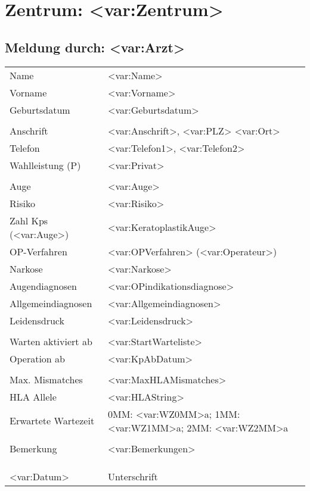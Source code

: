 \documentclass[a4,10pt]{scrreprt}
\begin{document}
\begin{table}
\setcounter{secnumdepth}{0}
\section{Zentrum: <var:Zentrum>}
\subsection{Meldung durch: <var:Arzt>}
\begin{tabular}{lp{12cm}} \hline
Name & <var:Name> \\
Vorname & <var:Vorname> \\
Geburtsdatum & <var:Geburtsdatum> \\ \hline
\\ \hline
Anschrift & <var:Anschrift>,  <var:PLZ> <var:Ort>\\
Telefon & <var:Telefon1>, <var:Telefon2>\\
Wahlleistung (P) & <var:Privat>\\ \hline
\\ \hline
Auge & <var:Auge>\\
Risiko & <var:Risiko>\\
Zahl Kps (<var:Auge>) & <var:KeratoplastikAuge>\\
OP-Verfahren & <var:OPVerfahren> (<var:Operateur>)\\ 
Narkose & <var:Narkose>\\ 
Augendiagnosen & <var:OPindikationsdiagnose>\\
Allgemeindiagnosen & <var:Allgemeindiagnosen>\\ \hline
Leidensdruck & <var:Leidensdruck>\\ \hline
\\ \hline
Warten aktiviert ab & <var:StartWarteliste>\\
Operation ab & <var:KpAbDatum>\\ \hline
\\ \hline
Max. Mismatches & <var:MaxHLAMismatches>\\
HLA Allele & <var:HLAString>\\
Erwartete Wartezeit & 0MM: <var:WZ0MM>a; 1MM: <var:WZ1MM>a; 2MM: <var:WZ2MM>a\\ \hline
\\ \hline
Bemerkung & <var:Bemerkungen>\\ \hline
\\
\\
\\
<var:Datum> & Unterschrift\\

\end{tabular}
\end{table}
\end{document}
